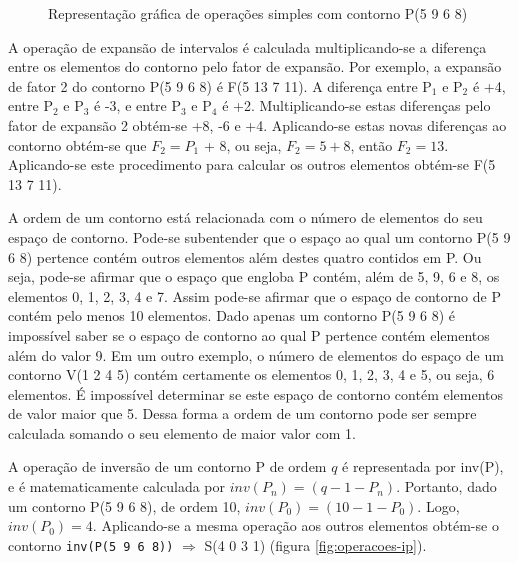 \begin{figure}
  \centering
  \subfloat[Contorno P]{
    \texttt{[image: c-5968]}
    \label{fig:operacoes-p}
  }
  \subfloat[Inversão de P]{
    \texttt{[image: c-4031]}
    \label{fig:operacoes-ip}
  }
  \subfloat[Retrógrado de P]{
    \texttt{[image: c-8695]}
    \label{fig:operacoes-rp}
  }

  \subfloat[Rotação 1 de P]{
    \texttt{[image: c-9685]}
    \label{fig:operacoes-rr1}
  }
  \subfloat[Rotação 2 de P]{
    \texttt{[image: c-6859]}
    \label{fig:operacoes-rr2}
  }
  \subfloat[Rotação 3 de P]{
    \texttt{[image: c-8596]}
    \label{fig:operacoes-rr3}
  }
  \caption{Representação gráfica de operações simples com contorno P(5
  9 6 8)}
  \label{fig:operacoes-simples}
\end{figure}

A operação de expansão de intervalos é calculada multiplicando-se a
diferença entre os elementos do contorno pelo fator de expansão. Por
exemplo, a expansão de fator 2 do contorno P(5 9 6 8) é F(5 13 7
11). A diferença entre P$_1$ e P$_2$ é +4, entre P$_2$ e P$_3$ é -3, e
entre P$_3$ e P$_4$ é +2. Multiplicando-se estas diferenças pelo fator
de expansão 2 obtém-se +8, -6 e +4. Aplicando-se estas novas
diferenças ao contorno obtém-se que $F_2 = P_1$ + 8, ou seja, $F_2 = 5
+ 8$, então $F_2 = 13$. Aplicando-se este procedimento para calcular
os outros elementos obtém-se F(5 13 7 11).

A ordem de um contorno está relacionada com o número de elementos do
seu espaço de contorno. Pode-se subentender que o espaço ao qual um
contorno P(5 9 6 8) pertence contém outros elementos além destes
quatro contidos em P. Ou seja, pode-se afirmar que o espaço que
engloba P contém, além de 5, 9, 6 e 8, os elementos 0, 1, 2, 3, 4 e
7. Assim pode-se afirmar que o espaço de contorno de P contém pelo
menos 10 elementos. Dado apenas um contorno P(5 9 6 8) é impossível
saber se o espaço de contorno ao qual P pertence contém elementos além
do valor 9. Em um outro exemplo, o número de elementos do espaço de um
contorno V(1 2 4 5) contém certamente os elementos 0, 1, 2, 3, 4 e 5,
ou seja, 6 elementos. É impossível determinar se este espaço de
contorno contém elementos de valor maior que 5. Dessa forma a ordem de
um contorno pode ser sempre calculada somando o seu elemento de maior
valor com 1.

A operação de inversão de um contorno P de ordem $q$ é representada
por inv(P), e é matematicamente calculada por
$inv(P_n)=(q-1-P_n)$. Portanto, dado um contorno P(5 9 6 8), de ordem
10, $inv(P_0)=(10-1-P_0)$. Logo, $inv(P_0)=4$. Aplicando-se a mesma
operação aos outros elementos obtém-se o contorno
\verb!inv(P(5 9 6 8))!  $\Rightarrow$ S(4 0 3 1) (figura
\ref{fig:operacoes-ip}).

